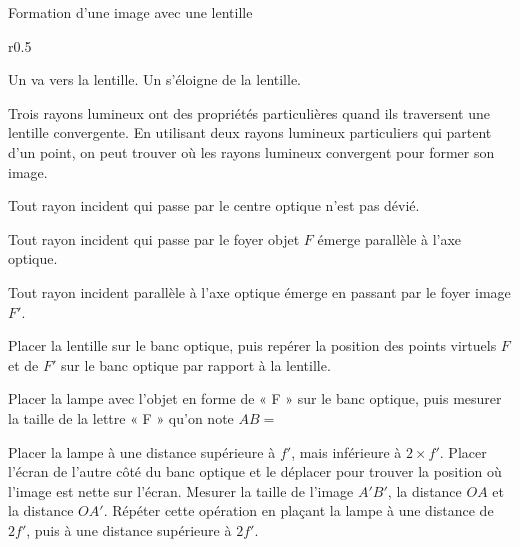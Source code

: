 \begin{doc}{Formation d'une image avec une lentille}
  \begin{wrapfigure}[6]{r}{0.5\linewidth}
    \vspace{-20pt}
    \begin{boite}
      \vspace{-8pt}
      \begin{importants}
        Un  va vers la lentille.
        Un  s'éloigne de la lentille.
      \end{importants}
    \end{boite}
  \end{wrapfigure}
  
  Trois rayons lumineux ont des propriétés particulières quand ils traversent une lentille convergente. 
  En utilisant deux rayons lumineux particuliers qui partent d'un point, on peut trouver où les rayons lumineux convergent pour former son image.

  \begin{listePoints}
    \item Tout rayon incident qui passe par le centre optique n'est pas dévié.
    \item Tout rayon incident qui passe par le foyer objet $F$ émerge parallèle à l'axe optique.
    \item Tout rayon incident parallèle à l'axe optique émerge en passant par le foyer image $F'$.
  \end{listePoints}

  \begin{center}
  \end{center}
\end{doc}

\mesure
Placer la lentille sur le banc optique, puis repérer la position des points virtuels $F$ et de $F'$ sur le banc optique par rapport à la lentille.

\mesure
Placer la lampe avec l'objet en forme de « F » sur le banc optique, puis mesurer la taille de la lettre « F » qu'on note $AB =$

\mesure 
Placer la lampe à une distance supérieure à $f'$, mais inférieure à $2\times f'$. 
Placer l'écran de l'autre côté du banc optique et le déplacer pour trouver la position où l'image est nette sur l'écran.
Mesurer la taille de l'image $A'B'$, la distance $OA$ et la distance              $OA'$.
Répéter cette opération en plaçant la lampe à une distance de $2f'$, puis à une distance supérieure à $2f'$.

